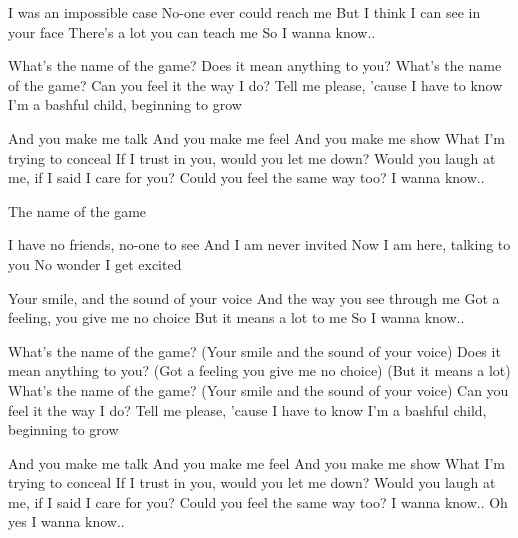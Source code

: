 I was an impossible case 
No-one ever could reach me 
But I think I can see in your face 
There's a lot you can teach me 
So I wanna know.. 
 
What's the name of the game? 
Does it mean anything to you? 
What's the name of the game? 
Can you feel it the way I do? 
Tell me please, 'cause I have to know 
I'm a bashful child, beginning to grow 
 
And you make me talk 
And you make me feel 
And you make me show 
What I'm trying to conceal 
If I trust in you, would you let me down? 
Would you laugh at me, if I said I care for you? 
Could you feel the same way too? 
I wanna know.. 
 
The name of the game 
 
I have no friends, no-one to see 
And I am never invited 
Now I am here, talking to you 
No wonder I get excited 
 
Your smile, and the sound of your voice 
And the way you see through me 
Got a feeling, you give me no choice 
But it means a lot to me 
So I wanna know.. 
 
What's the name of the game? (Your smile and the sound of your voice) 
Does it mean anything to you? (Got a feeling you give me no choice) 
(But it means a lot) 
What's the name of the game? (Your smile and the sound of your voice) 
Can you feel it the way I do? 
Tell me please, 'cause I have to know 
I'm a bashful child, beginning to grow 
 
And you make me talk 
And you make me feel 
And you make me show 
What I'm trying to conceal 
If I trust in you, would you let me down? 
Would you laugh at me, if I said I care for you? 
Could you feel the same way too? 
I wanna know.. 
Oh yes I wanna know.. 
 
